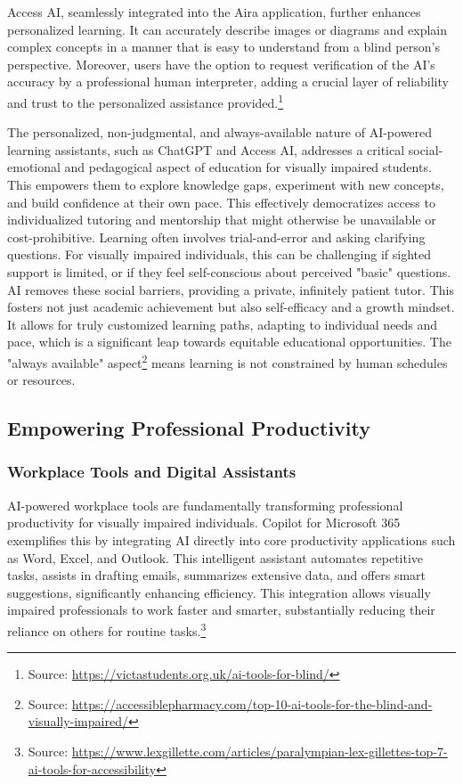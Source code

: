 Access AI, seamlessly integrated into the Aira application, further enhances personalized learning. It can accurately describe images or diagrams and explain complex concepts in a manner that is easy to understand from a blind person's perspective. Moreover, users have the option to request verification of the AI's accuracy by a professional human interpreter, adding a crucial layer of reliability and trust to the personalized assistance provided.\footnote{Source: \url{https://victastudents.org.uk/ai-tools-for-blind/}}

The personalized, non-judgmental, and always-available nature of AI-powered learning assistants, such as ChatGPT and Access AI, addresses a critical social-emotional and pedagogical aspect of education for visually impaired students. This empowers them to explore knowledge gaps, experiment with new concepts, and build confidence at their own pace. This effectively democratizes access to individualized tutoring and mentorship that might otherwise be unavailable or cost-prohibitive. Learning often involves trial-and-error and asking clarifying questions. For visually impaired individuals, this can be challenging if sighted support is limited, or if they feel self-conscious about perceived "basic" questions. AI removes these social barriers, providing a private, infinitely patient tutor. This fosters not just academic achievement but also self-efficacy and a growth mindset. It allows for truly customized learning paths, adapting to individual needs and pace, which is a significant leap towards equitable educational opportunities. The "always available" aspect\footnote{Source: \url{https://accessiblepharmacy.com/top-10-ai-tools-for-the-blind-and-visually-impaired/}} means learning is not constrained by human schedules or resources.

\subsection{Empowering Professional Productivity}

\subsubsection{Workplace Tools and Digital Assistants}

AI-powered workplace tools are fundamentally transforming professional productivity for visually impaired individuals. Copilot for Microsoft 365 exemplifies this by integrating AI directly into core productivity applications such as Word, Excel, and Outlook. This intelligent assistant automates repetitive tasks, assists in drafting emails, summarizes extensive data, and offers smart suggestions, significantly enhancing efficiency. This integration allows visually impaired professionals to work faster and smarter, substantially reducing their reliance on others for routine tasks.\footnote{Source: \url{https://www.lexgillette.com/articles/paralympian-lex-gillettes-top-7-ai-tools-for-accessibility}}

